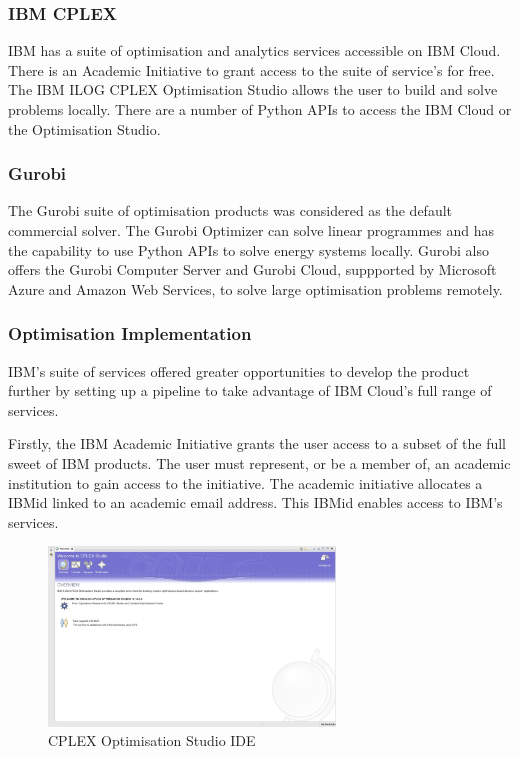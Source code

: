 \documentclass[12pt]{article}
\begin{document}
\subsubsection{IBM CPLEX}
IBM has a suite of optimisation and analytics services accessible on IBM Cloud.
There is an Academic Initiative to grant access to the suite of service's for free. 
The IBM ILOG CPLEX Optimisation Studio allows the user to build and solve problems locally.
There are a number of Python APIs to access the IBM Cloud or the Optimisation Studio.

\subsubsection{Gurobi}
The Gurobi suite of optimisation products was considered as the default commercial solver. 
The Gurobi Optimizer can solve linear programmes and has the capability to use Python APIs to solve energy systems locally. 
Gurobi also offers the Gurobi Computer Server and Gurobi Cloud, suppported by Microsoft Azure and Amazon Web Services, to solve large optimisation problems remotely.

\subsubsection{Optimisation Implementation}
IBM's suite of services offered greater opportunities to develop the product further
by setting up a pipeline to take advantage of IBM Cloud's full range of services.

Firstly, the IBM Academic Initiative grants the user access to a subset of the full sweet of IBM products.
The user must represent, or be a member of, an academic institution to gain access to the initiative.
The academic initiative allocates a IBMid linked to an academic email address. 
This IBMid enables access to IBM's services. 

\begin{figure}
	\begin{center}
		\includegraphics[width=0.68\textwidth]{COSIDE.png}
	\end{center}
	\caption{CPLEX Optimisation Studio IDE}
	\label{fig:COSIDE}
\end{figure}
\end{document}
